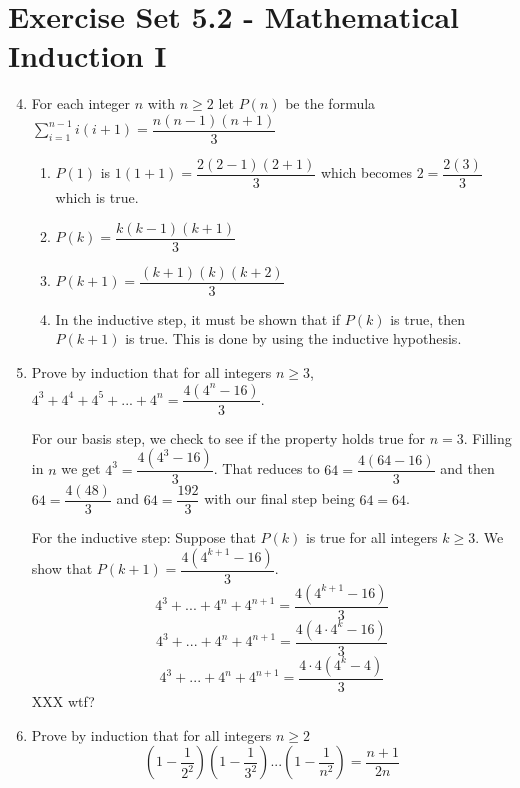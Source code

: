 \documentclass[12pt]{article}
\begin{document}
\setcounter{section}{5}
\section*{Exercise Set 5.2 - Mathematical Induction I}
\begin{enumerate}
  \setcounter{enumi}{3}
\item %
  For each integer $n$ with $n \geq 2$ let $P(n)$ be the formula\\
  $\displaystyle\sum_{i=1}^{n-1}i(i+1)=\dfrac{n(n-1)(n+1)}{3}$
\begin{enumerate}
\item $P(1)$ is $1(1+1) = \dfrac{2(2-1)(2+1)}{3}$ which becomes $2 = \dfrac{2(3)}{3}$ which is true.
\item $P(k) = \dfrac{k(k-1)(k+1)}{3}$
\item $P(k+1) = \dfrac{(k+1)(k)(k+2)}{3}$
\item In the inductive step, it must be shown that if $P(k)$ is true, then $P(k+1)$ is true. This is done by
  using the inductive hypothesis.
\end{enumerate}
  \setcounter{enumi}{8}
\item %
  Prove by induction that for all integers $n \geq 3$, $4^{3}+4^{4}+4^{5}+ ... + 4^{n} =
  \dfrac{4(4^{n}-16)}{3}$.

  For our basis step, we check to see if the property holds true for $n = 3$. Filling in $n$ we get $4^{3} =
  \dfrac{4(4^{3}-16)}{3}$. That reduces to $64 = \dfrac{4(64-16)}{3}$ and then $64 = \dfrac{4(48)}{3}$
  and $64 = \dfrac{192}{3}$ with our final step being $64 = 64$.

  For the inductive step: Suppose that $P(k)$ is true for all integers $k \geq 3$.
  We show that $P(k+1) = \dfrac{4(4^{k+1}-16)}{3}$.
  $$4^{3} + ... + 4^{n} + 4^{n+1} = \dfrac{4(4^{k+1}-16)}{3}$$
  $$4^{3} + ... + 4^{n} + 4^{n+1} = \dfrac{4(4 \cdot 4^{k}-16)}{3}$$
  $$4^{3} + ... + 4^{n} + 4^{n+1} = \dfrac{4\cdot4( 4^{k}-4)}{3}$$
  XXX wtf?
  \setcounter{enumi}{15}
\item %
Prove by induction that for all integers $n \geq 2$ 
$$ (1- \dfrac{1}{2^{2}})(1-\dfrac{1}{3^{2}}) ... (1-\dfrac{1}{n^{2}}) = \dfrac{n+1}{2n}$$

\end{enumerate}
\end{document}
